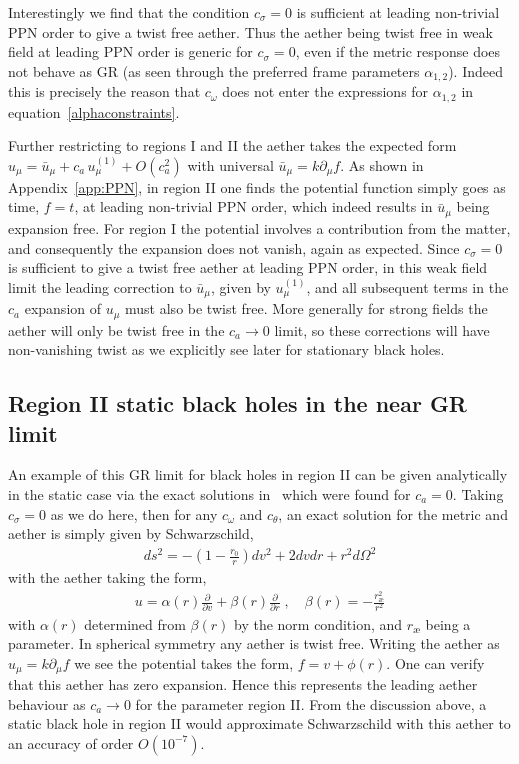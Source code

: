 \documentclass[12pt]{article}
\numberwithin{equation}{section}
\begin{document}
Interestingly we find that the condition $c_\sigma = 0$ is sufficient at leading non-trivial PPN order to give a twist free aether. 
Thus the aether being twist free in weak field at leading PPN order is generic for $c_\sigma=0$, even if the metric response does not behave as GR (as seen through the preferred frame parameters $\alpha_{1,2}$). Indeed this is precisely the reason that $c_\omega$ does not enter the expressions for $\alpha_{1,2}$ in equation~\eqref{alphaconstraints}.

Further restricting to regions I and II the aether takes the expected form $u_\mu = \bar{u}_\mu + c_a \, u^{(1)}_{\mu} + O(c_a^2)$ with universal $\bar{u}_\mu = k \partial_\mu f$. As shown in Appendix~\ref{app:PPN}, in region II one finds the potential function simply goes as time, $f = t$, at leading non-trivial PPN order, which indeed results in $\bar{u}_\mu$ being expansion free. For region I the potential involves a contribution from the matter, and consequently  the expansion does not vanish, again as expected.
Since $c_\sigma = 0$ is sufficient to give a twist free aether at leading PPN order, in this weak field limit the leading correction to $\bar{u}_\mu$, given by $u^{(1)}_\mu$, and all subsequent terms in the $c_a$ expansion of $u_\mu$ must also be twist free. More generally for strong fields the aether will only be twist free in the $c_a \to 0$ limit, so these corrections will have non-vanishing twist as we explicitly see later for stationary black holes.


\subsection{Region II static black holes in the near GR limit}

An example of this GR limit for black holes in region II can be given analytically in the static case via the exact solutions  in~\cite{Berglund:2012bu} which were found for $c_a = 0$. Taking $c_{\sigma} = 0$ as we do here, then for any $c_{\omega}$ and $c_{\theta}$, an exact solution for the metric and aether is simply given by Schwarzschild,
\begin{eqnarray}
\label{eq:exact1}
ds^2 = - \left(1 - \frac{r_0}{r}\right) dv^2 + 2 dv dr + r^2 d\Omega^2 
\end{eqnarray}
with the aether taking the form,
\begin{eqnarray}
\label{eq:exact2}
u = \alpha(r) \frac{\partial}{\partial v} + \beta(r) \frac{\partial}{\partial r} 
\; , \quad 
\beta(r) = - \frac{r_{\text{\ae}}^2}{r^2}
\end{eqnarray}
with $\alpha(r)$ determined from $\beta(r)$ by the norm condition, and $r_{\text{\ae}}$ being a parameter. In spherical symmetry any aether is twist free. Writing the aether as $u_\mu = k \partial_\mu f$ we see the potential takes the form,
$f = v + \phi(r)$. One can verify that this aether has zero expansion. Hence this represents the leading aether behaviour as $c_a \to 0$ for the parameter region II. From the discussion above, a static black hole in region II would approximate Schwarzschild with this aether to an accuracy of order $O(10^{-7})$.
\end{document}
